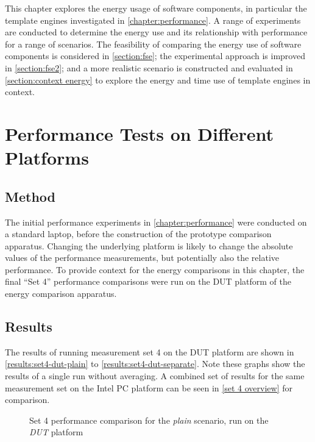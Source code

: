 This chapter explores the energy usage of software components, in particular the \gls{template engine}s investigated in \autoref{chapter:performance}. A range of experiments are conducted to determine the energy use and its relationship with performance for a range of scenarios. The feasibility of comparing the energy use of software components is considered in \autoref{section:fse}; the experimental approach is improved in \autoref{section:fse2}; and a more realistic scenario is constructed and evaluated in \autoref{section:context energy} to explore the energy and time use of \gls{template engine}s in context.

\section{Performance Tests on Different Platforms}
\label{section:perf dut}

\subsection{Method}
\label{pc vs dut method}
The initial performance experiments in \autoref{chapter:performance} were conducted on a standard laptop, before the construction of the prototype comparison apparatus. Changing the underlying platform is likely to change the absolute values of the performance measurements, but potentially also the relative performance. To provide context for the energy comparisons in this chapter, the final \enquote{Set 4} performance comparisons were run on the DUT platform of the energy comparison apparatus.

\subsection{Results}

The results of running measurement set 4 on the DUT platform are shown in \autoref{results:set4-dut-plain} to \autoref{results:set4-dut-separate}. Note these graphs show the results of a single run without averaging. A combined set of results for the same measurement set on the Intel PC platform can be seen in \autoref{set 4 overview} for comparison.

\begin{figure}[!p]
\centering

\caption{\label{results:set4-dut-plain}Set 4 performance comparison for the \emph{plain} scenario, run on the \emph{DUT} platform}
\end{figure}

